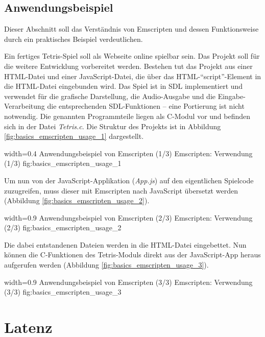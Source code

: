 \subsection{Anwendungsbeispiel}\label{anwendungsbeispiel}

Dieser Abschnitt soll das Verständnis von Emscripten und dessen
Funktionsweise durch ein praktisches Beispiel verdeutlichen.

Ein fertiges Tetris-Spiel soll als Webseite online spielbar sein.
Das Projekt soll für die weitere Entwicklung vorbereitet werden.
Bestehen tut das Projekt aus einer HTML-Datei und einer JavaScript-Datei, die
über das HTML-``script''-Element in die HTML-Datei eingebunden wird. Das
Spiel ist in SDL implementiert und verwendet für die grafische
Darstellung, die Audio-Ausgabe und die Eingabe-Verarbeitung die
entsprechenden SDL-Funktionen -- eine Portierung ist nicht notwendig.
Die genannten Programmteile liegen als C-Modul vor und befinden sich
in der Datei \emph{Tetris.c}. Die Struktur des Projekts ist in Abbildung
\ref{fig:basics_emscripten_usage_1} dargestellt.

   {width=0.4\textwidth}
   {Anwendungsbeispiel von Emscripten (1/3)}
   {Emscripten: Verwendung (1/3)}
   {fig:basics_emscripten_usage_1}

Um nun von der JavaScript-Applikation (\emph{App.js}) auf den
eigentlichen Spielcode zuzugreifen, muss dieser mit Emscripten nach
JavaScript übersetzt werden (Abbildung \ref{fig:basics_emscripten_usage_2}).

   {width=0.9\textwidth}
   {Anwendungsbeispiel von Emscripten (2/3)}
   {Emscripten: Verwendung (2/3)}
   {fig:basics_emscripten_usage_2}

Die dabei entstandenen Dateien werden in die HTML-Datei eingebettet. Nun
können die C-Funktionen des Tetris-Moduls direkt aus der JavaScript-App
heraus aufgerufen werden (Abbildung \ref{fig:basics_emscripten_usage_3}).

   {width=0.9\textwidth}
   {Anwendungsbeispiel von Emscripten (3/3)}
   {Emscripten: Verwendung (3/3)}
   {fig:basics_emscripten_usage_3}

\section{Latenz}\label{latenz}

